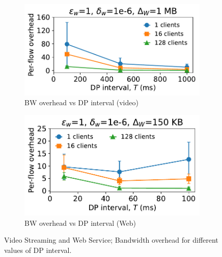 \begin{figure}[t]
  \centering
  \begin{subfigure}{0.49\columnwidth}
      \centering
      \includegraphics[width=\textwidth]{plots/overhead_vs_dp_interval_video.pdf}
      \caption{BW overhead vs DP interval (video)}
      \label{fig:video-overhead-vs-dpInt}
  \end{subfigure}
  \hfill
  \begin{subfigure}{0.49\columnwidth}
      \centering
      \includegraphics[width=\textwidth]{plots/overhead_vs_dp_interval_web.pdf}
      \caption{BW overhead vs DP interval (Web)}
      \label{fig:web-overhead-vs-dpInt}
  \end{subfigure}
  \caption{Video Streaming and Web Service; Bandwidth overhead for different values of DP interval.
  }
\end{figure}


